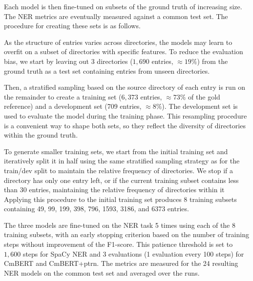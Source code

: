 Each model is then fine-tuned on subsets of the ground truth of increasing size.
The NER metrics are eventually measured against a common test set.
The procedure for creating these sets is as follows. 

As the structure of entries varies across directories, the models may learn to overfit on a subset of directories with specific features. 
To reduce the evaluation bias, we start by leaving out 3 directories ($1,690$ entries, $\approx 19\%$) from the ground truth as a test set containing entries from unseen directories.

Then, a stratified sampling based on the source directory of each entry is run on the remainder to create a training set ($6,373$ entries, $\approx 73\%$ of the gold reference) and a development set (709 entries, $\approx 8\%$).
The development set is used to evaluate the model during the training phase.
This resampling procedure is a convenient way to shape both sets, so they reflect the diversity of directories within the ground truth.

To generate smaller training sets, we start from the initial training set and iteratively split it in half using the same stratified sampling strategy as for the train/dev split to maintain the relative frequency of directories. 
We stop if a directory has only one entry left, or if the current training subset contains less than 30 entries, maintaining the relative frequency of directories within it
Applying this procedure to the initial training set produces 8 training subsets containing 49, 99, 199, 398, 796, 1593, 3186, and 6373 entries.

The three models are fine-tuned on the NER task 5 times using each of the 8 training subsets, with an early stopping criterion based on the number of training steps without improvement of the F1-score. 
This patience threshold is set to $1,600$ steps for SpaCy NER and 3 evaluations (1 evaluation every 100 steps) for CmBERT and CmBERT+ptrn.
The metrics are measured for the 24 resulting NER models on the common test set and averaged over the runs.





